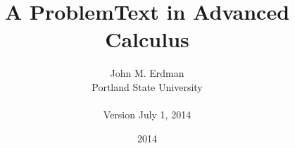 \documentclass[11pt,reqno]{amsbook}
\theoremstyle{plain}
\theoremstyle{definition}
\theoremstyle{remark}
\numberwithin{equation}{chapter}
\begin{document}
\frontmatter
\title{A ProblemText in Advanced Calculus}
\author{John M. Erdman\\
     Portland State University \\
     \mbox{\hphantom{P}} \\
     Version July 1, 2014}
\date{2014}



\maketitle

\tableofcontents



 \cleardoublepage





\mainmatter

 
 
 
 
 
 
 
 
 
 
 
 
 
 
 
 
 
 
 
 
 
 
 
 
 
 
 
 
 
 


\appendix

 
 
 
 
 
 
 
 
 
 
 
 
 
 
 
 
 
 

\backmatter


 \cleardoublepage
 
 


 \cleardoublepage
 \printindex
\end{document}
